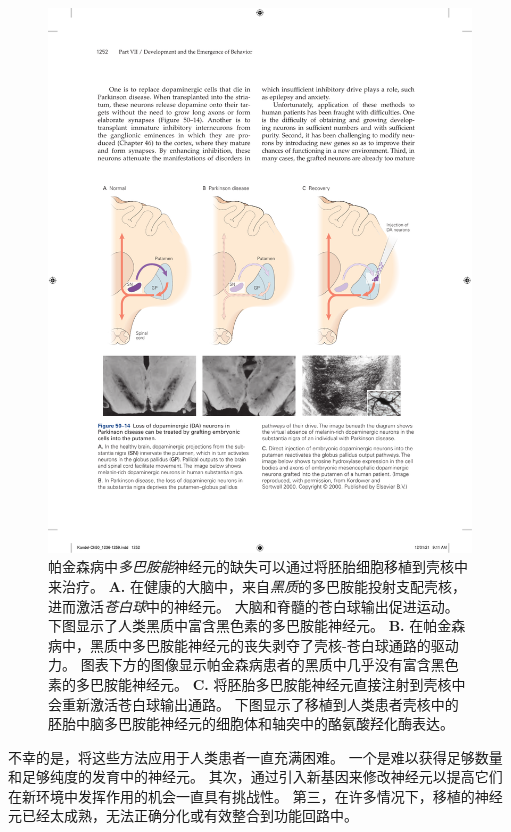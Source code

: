 \begin{figure}[htbp]
	\centering
	\includegraphics[width=0.95\linewidth]{chap50/fig_50_14}
	\caption{帕金森病中\textit{多巴胺能}神经元的缺失可以通过将胚胎细胞移植到壳核中来治疗。
		\textbf{A.} 在健康的大脑中，来自\textit{黑质}的多巴胺能投射支配壳核，进而激活\textit{苍白球}中的神经元。
		大脑和脊髓的苍白球输出促进运动。
		下图显示了人类黑质中富含黑色素的多巴胺能神经元。
		\textbf{B.} 在帕金森病中，黑质中多巴胺能神经元的丧失剥夺了壳核-苍白球通路的驱动力。
		图表下方的图像显示帕金森病患者的黑质中几乎没有富含黑色素的多巴胺能神经元。
		\textbf{C.} 将胚胎多巴胺能神经元直接注射到壳核中会重新激活苍白球输出通路。
		下图显示了移植到人类患者壳核中的胚胎中脑多巴胺能神经元的细胞体和轴突中的酪氨酸羟化酶表达\cite{kordower2000neuropathology}。}
	\label{fig:50_14}
\end{figure}


不幸的是，将这些方法应用于人类患者一直充满困难。
一个是难以获得足够数量和足够纯度的发育中的神经元。
其次，通过引入新基因来修改神经元以提高它们在新环境中发挥作用的机会一直具有挑战性。
第三，在许多情况下，移植的神经元已经太成熟，无法正确分化或有效整合到功能回路中。


